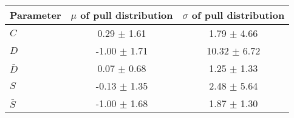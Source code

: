\begin{tabular}{l | c | c}
\hline
Parameter & $\mu$ of pull distribution & $\sigma$ of pull distribution \\
\hline
\hline
$C$ & 0.29 $\pm$ 1.61 & 1.79 $\pm$ 4.66 \\
$D$ & -1.00 $\pm$ 1.71 & 10.32 $\pm$ 6.72 \\
$\bar{D}$ & 0.07 $\pm$ 0.68 & 1.25 $\pm$ 1.33 \\
$S$ & -0.13 $\pm$ 1.35 & 2.48 $\pm$ 5.64 \\
$\bar{S}$ & -1.00 $\pm$ 1.68 & 1.87 $\pm$ 1.30 \\
\hline
\end{tabular}
